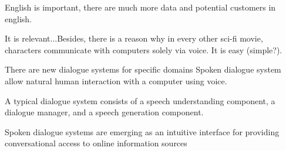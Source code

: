 English is important, there are much more data and potential customers in english.

It is relevant...Besides, there is a reason why in every other sci-fi movie, characters communicate with computers solely via voice. It is easy (simple?).

There are new dialogue systems for specific domains
Spoken dialogue system allow natural human interaction with a computer using voice. 

A typical dialogue system consists of a speech understanding component, a dialogue manager, and a speech generation component.

Spoken dialogue systems are emerging as an intuitive interface for providing conversational access to online information sources












